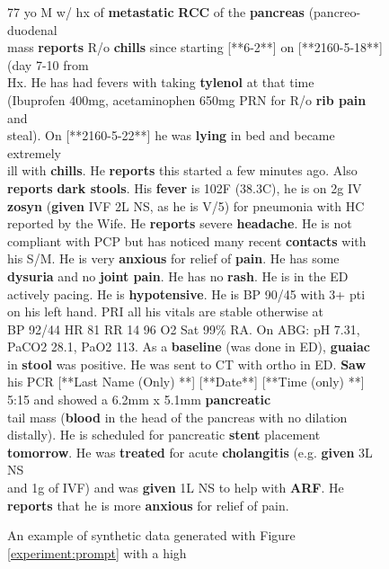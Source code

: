 \begin{figure}[h]
\centering
\begin{tcolorbox}[colback=orange!5!white,colframe=orange!75!black]
77 yo M w/ hx of \textbf{metastatic} \textbf{RCC} of the \textbf{pancreas} (pancreo-duodenal \\
mass \textbf{reports} R/o \textbf{chills} since starting [**6-2**] on [**2160-5-18**] (day 7-10 from \\
Hx. He has had fevers with taking \textbf{tylenol} at that time \\
(Ibuprofen 400mg, acetaminophen 650mg PRN for R/o \textbf{rib pain} and \\
steal). On [**2160-5-22**] he was \textbf{lying} in bed and became extremely \\
ill with \textbf{chills}. He \textbf{reports} this started a few minutes ago. Also \\
\textbf{reports} \textbf{dark stools}. His \textbf{fever} is 102F (38.3C), he is on 2g IV \\
\textbf{zosyn} (\textbf{given} IVF 2L NS, as he is V/5) for pneumonia with HC \\
reported by the Wife. He \textbf{reports} severe \textbf{headache}. He is not \\
compliant with PCP but has noticed many recent \textbf{contacts} with \\
his S/M. He is very \textbf{anxious} for relief of \textbf{pain}. He has some \\
\textbf{dysuria} and no \textbf{joint pain}. He has no \textbf{rash}. He is in the ED \\
actively pacing. He is \textbf{hypotensive}. He is BP 90/45 with 3+ pti \\
on his left hand. PRI all his vitals are stable otherwise at \\
BP 92/44 HR 81 RR 14 96 O2 Sat 99\% RA. On ABG: pH 7.31, \\
PaCO2 28.1, PaO2 113. As a \textbf{baseline} (was done in ED), \textbf{guaiac} \\
in \textbf{stool} was positive. He was sent to CT with ortho in ED. \textbf{Saw} \\
his PCR [**Last Name (Only) **] [**Date**] [**Time (only) **] 5:15 and showed a 6.2mm x 5.1mm \textbf{pancreatic} \\
tail mass (\textbf{blood} in the head of the pancreas with no dilation \\
distally). He is scheduled for pancreatic \textbf{stent} placement \\
\textbf{tomorrow}. He was \textbf{treated} for acute \textbf{cholangitis} (e.g. \textbf{given} 3L NS \\
and 1g of IVF) and was \textbf{given} 1L NS to help with \textbf{ARF}. He \\
\textbf{reports} that he is more \textbf{anxious} for relief of pain.
\end{tcolorbox}
\caption{An example of synthetic data generated with Figure \ref{experiment:prompt} with a high \score}
\label{fig:synthetic-example}
\end{figure}

